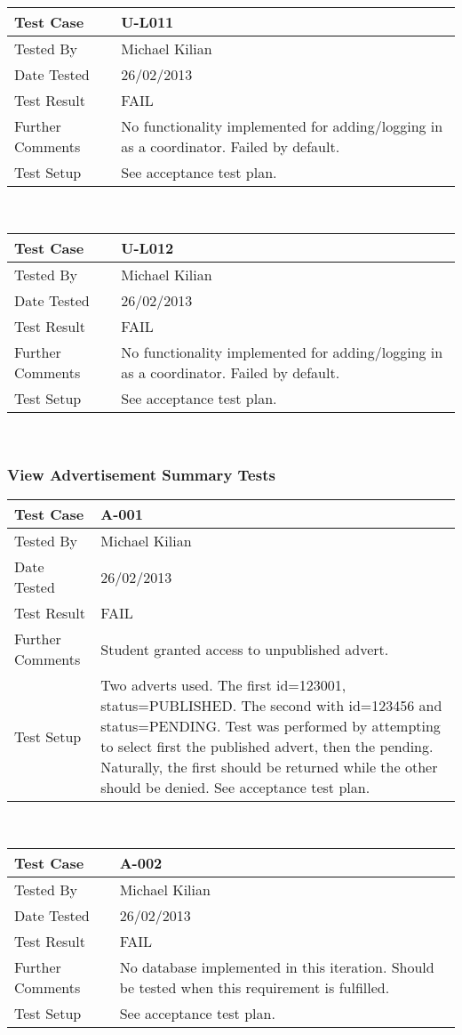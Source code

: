 \documentclass{l3deliverable}
\begin{document}
\begin{tabular}{lp{10cm}}
\hline 
\textbf{Test Case} & U-L011\tabularnewline
\hline 
\hline 
Tested By & Michael Kilian\tabularnewline
\hline 
Date Tested & 26/02/2013\tabularnewline
\hline 
Test Result & FAIL\tabularnewline
\hline
Further Comments &  No functionality implemented for adding/logging in as a coordinator. Failed by default. \tabularnewline
\hline
Test Setup &  See acceptance test plan. \tabularnewline
\hline
\end{tabular}\\

\begin{tabular}{lp{10cm}}
\hline 
\textbf{Test Case} & U-L012\tabularnewline
\hline 
\hline 
Tested By & Michael Kilian\tabularnewline
\hline 
Date Tested & 26/02/2013\tabularnewline
\hline 
Test Result & FAIL\tabularnewline
\hline
Further Comments &  No functionality implemented for adding/logging in as a coordinator. Failed by default. \tabularnewline
\hline
Test Setup &  See acceptance test plan. \tabularnewline
\hline
\end{tabular}\\


\subsubsection{View Advertisement Summary Tests}

\begin{tabular}{lp{10cm}}
\hline 
\textbf{Test Case} & A-001\tabularnewline
\hline 
\hline 
Tested By & Michael Kilian\tabularnewline
\hline 
Date Tested & 26/02/2013\tabularnewline
\hline 
Test Result & FAIL\tabularnewline
\hline
Further Comments &  Student granted access to unpublished advert. \tabularnewline
\hline
Test Setup &  Two adverts used. The first id=123001, status=PUBLISHED. The second with id=123456 and status=PENDING. Test was performed by attempting to select first the published advert, then the pending. Naturally, the first should be returned while the other should be denied. See acceptance test plan. \tabularnewline
\hline
\end{tabular}\\

\begin{tabular}{lp{10cm}}
\hline 
\textbf{Test Case} & A-002\tabularnewline
\hline 
\hline 
Tested By & Michael Kilian\tabularnewline
\hline 
Date Tested & 26/02/2013\tabularnewline
\hline 
Test Result & FAIL\tabularnewline
\hline
Further Comments &  No database implemented in this iteration. Should be tested when this requirement is fulfilled. \tabularnewline
\hline
Test Setup &  See acceptance test plan. \tabularnewline
\hline
\end{tabular}\\
\end{document}
